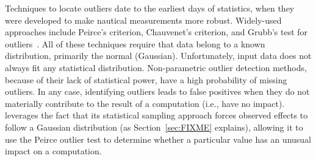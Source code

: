 Techniques to locate outliers date to the earliest days of statistics,
when they were developed to make nautical measurements more
robust. Widely-used approaches include Peirce's criterion, Chauvenet's
criterion, and Grubb's test for
outliers~\cite{barnett1994outliers}. All of these techniques require
that data belong to a known distribution, primarily the normal
(Gaussian). Unfortunately, input data does not always fit any
statistical distribution. Non-parametric outlier detection methods,
because of their lack of statistical power, have a high probability of
missing outliers. In any case, identifying outliers
leads to false positives when they do not materially contribute
to the result of a computation (i.e., have no impact).
\checkcell{} leverages the
fact that its statistical sampling approach forces observed effects to
follow a Gaussian distribution (as Section~\ref{sec:FIXME} explains),
allowing it to use the Peirce outlier test to determine whether a
particular value has an unusual impact on a computation.

